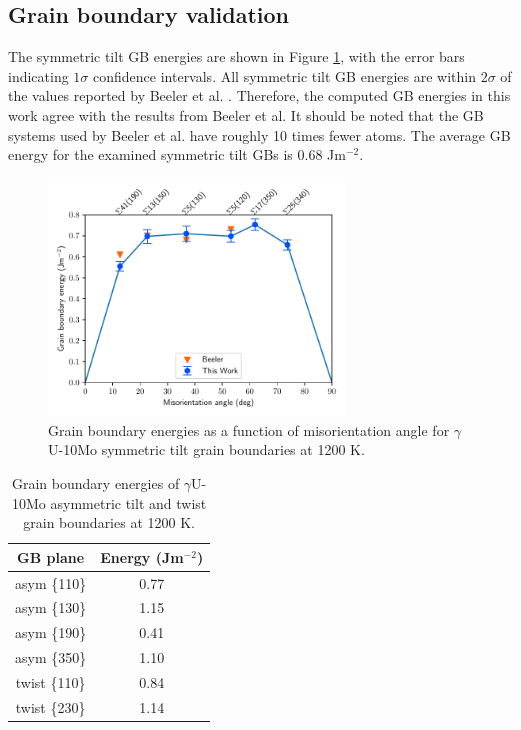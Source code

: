 \documentclass{elsarticle}
\begin{document}
\subsection{Grain boundary validation}

The symmetric tilt GB energies are shown in Figure \ref{fig:gbe}, with the error bars indicating $1\sigma$ confidence intervals. All symmetric tilt GB energies are within $2\sigma$ of the values reported by Beeler et al. \cite{beeler2018}. Therefore, the computed GB energies in this work agree with the results from Beeler et al. It should be noted that the GB systems used by Beeler et al. have roughly 10 times fewer atoms. The average GB energy for the examined symmetric tilt GBs is 0.68 Jm$^{-2}$.

\begin{figure}[!ht]
\centering
\includegraphics[width=0.70\textwidth]{gbe.pdf}
\caption{Grain boundary energies as a function of misorientation angle for $\gamma$U-10Mo symmetric tilt grain boundaries at 1200 K.}
\label{fig:gbe}
\end{figure}

\begin{table}[!ht]
\centering
\caption{Grain boundary energies of $\gamma$U-10Mo asymmetric tilt and twist grain boundaries at 1200 K.}
\label{tab:gbe}
\begin{tabular}{cc}
\toprule
GB plane & Energy (Jm$^{-2}$) \\
\midrule
asym  \{110\} & 0.77 \\
asym  \{130\} & 1.15 \\
asym  \{190\} & 0.41 \\
asym  \{350\} & 1.10 \\
twist \{110\} & 0.84 \\
twist \{230\} & 1.14 \\
\bottomrule
\end{tabular}
\end{table}
\end{document}
